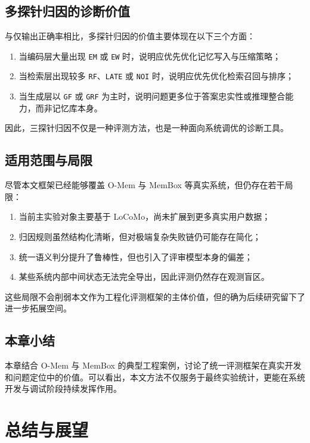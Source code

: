 \section{多探针归因的诊断价值}

与仅输出正确率相比，多探针归因的价值主要体现在以下三个方面：

\begin{enumerate}
    \item 当编码层大量出现 \texttt{EM} 或 \texttt{EW} 时，说明应优先优化记忆写入与压缩策略；
    \item 当检索层出现较多 \texttt{RF}、\texttt{LATE} 或 \texttt{NOI} 时，说明应优先优化检索召回与排序；
    \item 当生成层以 \texttt{GF} 或 \texttt{GRF} 为主时，说明问题更多位于答案忠实性或推理整合能力，而非记忆库本身。
\end{enumerate}

因此，三探针归因不仅是一种评测方法，也是一种面向系统调优的诊断工具。

\section{适用范围与局限}

尽管本文框架已经能够覆盖 O-Mem 与 MemBox 等真实系统，但仍存在若干局限：

\begin{enumerate}
    \item 当前主实验对象主要基于 LoCoMo，尚未扩展到更多真实用户数据；
    \item 归因规则虽然结构化清晰，但对极端复杂失败链仍可能存在简化；
    \item 统一语义判分提升了鲁棒性，但也引入了评审模型本身的偏差；
    \item 某些系统内部中间状态无法完全导出，因此评测仍然存在观测盲区。
\end{enumerate}

这些局限不会削弱本文作为工程化评测框架的主体价值，但的确为后续研究留下了进一步拓展空间。

\section{本章小结}

本章结合 O-Mem 与 MemBox 的典型工程案例，讨论了统一评测框架在真实开发和问题定位中的价值。可以看出，本文方法不仅服务于最终实验统计，更能在系统开发与调试阶段持续发挥作用。

\chapter{总结与展望}

